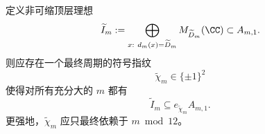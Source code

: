 \begin{conjecture}[次极值非可缩块的扇区刚性]\label{conj:conclusion-noncontractible-top-sector-rigidity}
定义非可缩顶层理想
\[
\widetilde I_m
:=
\bigoplus_{x:\ d_m(x)=\widetilde D_m}M_{\widetilde D_m}(\CC)
\subset A_{m,1}.
\]
则应存在一个最终周期的符号指纹
\[
\widetilde\chi_m\in\{\pm1\}^2
\]
使得对所有充分大的 \(m\) 都有
\[
\widetilde I_m\subseteq e_{\widetilde\chi_m}A_{m,1}.
\]
更强地，\(\widetilde\chi_m\) 应只最终依赖于 \(m\bmod 12\)。
\end{conjecture}
